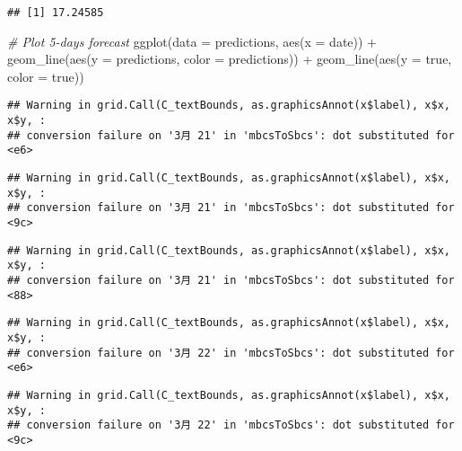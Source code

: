 \documentclass[
]{article}
\newenvironment{Shaded}{\begin{snugshade}}{\end{snugshade}}
\newcommand{\AttributeTok}[1]{\textcolor[rgb]{0.77,0.63,0.00}{#1}}
\newcommand{\CommentTok}[1]{\textcolor[rgb]{0.56,0.35,0.01}{\textit{#1}}}
\newcommand{\FunctionTok}[1]{\textcolor[rgb]{0.00,0.00,0.00}{#1}}
\newcommand{\NormalTok}[1]{#1}
\newcommand{\SpecialCharTok}[1]{\textcolor[rgb]{0.00,0.00,0.00}{#1}}
\newcommand{\StringTok}[1]{\textcolor[rgb]{0.31,0.60,0.02}{#1}}
\begin{document}
\begin{verbatim}
## [1] 17.24585
\end{verbatim}

\begin{Shaded}
\begin{Highlighting}[]
\CommentTok{\# Plot 5{-}days forecast}
\FunctionTok{ggplot}\NormalTok{(}\AttributeTok{data =}\NormalTok{ predictions, }\FunctionTok{aes}\NormalTok{(}\AttributeTok{x =}\NormalTok{ date)) }\SpecialCharTok{+}
  \FunctionTok{geom\_line}\NormalTok{(}\FunctionTok{aes}\NormalTok{(}\AttributeTok{y =}\NormalTok{ predictions, }\AttributeTok{color =} \StringTok{\textquotesingle{}predictions\textquotesingle{}}\NormalTok{)) }\SpecialCharTok{+}
  \FunctionTok{geom\_line}\NormalTok{(}\FunctionTok{aes}\NormalTok{(}\AttributeTok{y =}\NormalTok{ true, }\AttributeTok{color =} \StringTok{\textquotesingle{}true\textquotesingle{}}\NormalTok{))}
\end{Highlighting}
\end{Shaded}

\begin{verbatim}
## Warning in grid.Call(C_textBounds, as.graphicsAnnot(x$label), x$x, x$y, :
## conversion failure on '3月 21' in 'mbcsToSbcs': dot substituted for <e6>
\end{verbatim}

\begin{verbatim}
## Warning in grid.Call(C_textBounds, as.graphicsAnnot(x$label), x$x, x$y, :
## conversion failure on '3月 21' in 'mbcsToSbcs': dot substituted for <9c>
\end{verbatim}

\begin{verbatim}
## Warning in grid.Call(C_textBounds, as.graphicsAnnot(x$label), x$x, x$y, :
## conversion failure on '3月 21' in 'mbcsToSbcs': dot substituted for <88>
\end{verbatim}

\begin{verbatim}
## Warning in grid.Call(C_textBounds, as.graphicsAnnot(x$label), x$x, x$y, :
## conversion failure on '3月 22' in 'mbcsToSbcs': dot substituted for <e6>
\end{verbatim}

\begin{verbatim}
## Warning in grid.Call(C_textBounds, as.graphicsAnnot(x$label), x$x, x$y, :
## conversion failure on '3月 22' in 'mbcsToSbcs': dot substituted for <9c>
\end{verbatim}
\end{document}

